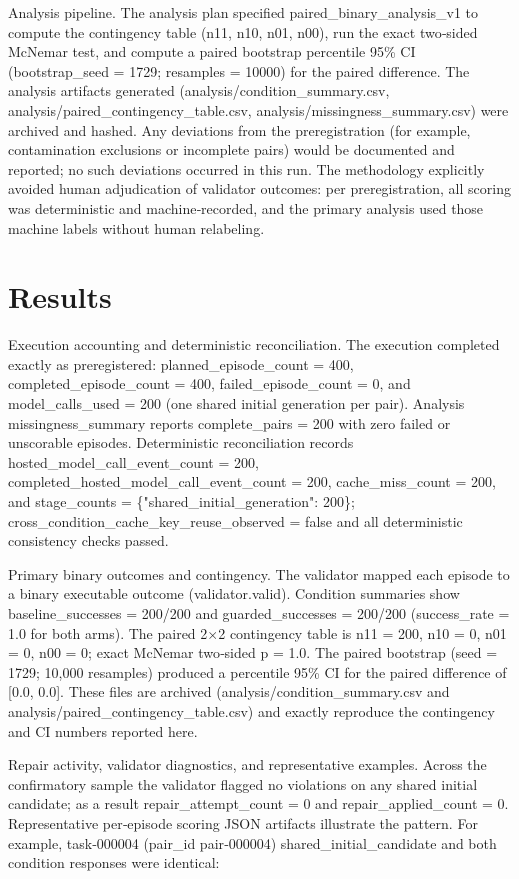 \documentclass[conference]{IEEEtran}
\begin{document}
Analysis pipeline. The analysis plan specified paired\_binary\_analysis\_v1 to compute the contingency table (n11, n10, n01, n00), run the exact two‑sided McNemar test, and compute a paired bootstrap percentile 95\% CI (bootstrap\_seed = 1729; resamples = 10000) for the paired difference. The analysis artifacts generated (analysis/condition\_summary.csv, analysis/paired\_contingency\_table.csv, analysis/missingness\_summary.csv) were archived and hashed. Any deviations from the preregistration (for example, contamination exclusions or incomplete pairs) would be documented and reported; no such deviations occurred in this run. The methodology explicitly avoided human adjudication of validator outcomes: per preregistration, all scoring was deterministic and machine‑recorded, and the primary analysis used those machine labels without human relabeling.

\section{Results}
Execution accounting and deterministic reconciliation. The execution completed exactly as preregistered: planned\_episode\_count = 400, completed\_episode\_count = 400, failed\_episode\_count = 0, and model\_calls\_used = 200 (one shared initial generation per pair). Analysis missingness\_summary reports complete\_pairs = 200 with zero failed or unscorable episodes. Deterministic reconciliation records hosted\_model\_call\_event\_count = 200, completed\_hosted\_model\_call\_event\_count = 200, cache\_miss\_count = 200, and stage\_counts = \{"shared\_initial\_generation": 200\}; cross\_condition\_cache\_key\_reuse\_observed = false and all deterministic consistency checks passed.

Primary binary outcomes and contingency. The validator mapped each episode to a binary executable outcome (validator.valid). Condition summaries show baseline\_successes = 200/200 and guarded\_successes = 200/200 (success\_rate = 1.0 for both arms). The paired 2\ensuremath{\times}2 contingency table is n11 = 200, n10 = 0, n01 = 0, n00 = 0; exact McNemar two‑sided p = 1.0. The paired bootstrap (seed = 1729; 10,000 resamples) produced a percentile 95\% CI for the paired difference of [0.0, 0.0]. These files are archived (analysis/condition\_summary.csv and analysis/paired\_contingency\_table.csv) and exactly reproduce the contingency and CI numbers reported here.

Repair activity, validator diagnostics, and representative examples. Across the confirmatory sample the validator flagged no violations on any shared initial candidate; as a result repair\_attempt\_count = 0 and repair\_applied\_count = 0. Representative per‑episode scoring JSON artifacts illustrate the pattern. For example, task‑000004 (pair\_id pair‑000004) shared\_initial\_candidate and both condition responses were identical:
\end{document}
